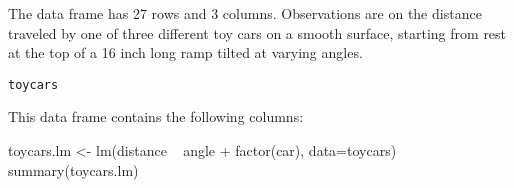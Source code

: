 \begin{Description}\relax
The  data frame has 27 rows and 3 columns.
Observations are on the
distance traveled by one of three different toy cars on
a smooth surface, starting from rest at the top of a 16 inch long ramp
tilted at varying angles.
\end{Description}
\begin{Usage}
\begin{verbatim}toycars\end{verbatim}
\end{Usage}
\begin{Format}\relax
This data frame contains the following columns:
\end{Format}
\begin{Examples}
\begin{ExampleCode}
toycars.lm <- lm(distance ~ angle + factor(car), data=toycars)
summary(toycars.lm)
\end{ExampleCode}
\end{Examples}

